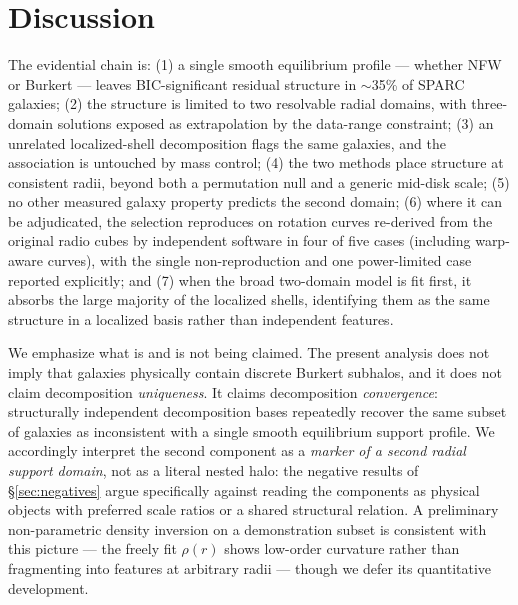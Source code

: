 \documentclass[twocolumn]{aastex701}
\begin{document}
\section{Discussion} \label{sec:discussion}

The evidential chain is: (1) a single smooth equilibrium profile ---
whether NFW or Burkert --- leaves BIC-significant residual structure in
$\sim$35\% of SPARC galaxies; (2) the structure is limited to two resolvable
radial domains, with three-domain solutions exposed as extrapolation by the
data-range constraint; (3) an unrelated localized-shell decomposition flags
the same galaxies, and the association is untouched by mass control; (4) the
two methods place structure at consistent radii, beyond both a permutation
null and a generic mid-disk scale; (5) no other measured galaxy property
predicts the second domain; (6) where it can be adjudicated, the selection
reproduces on rotation curves re-derived from the original radio cubes by
independent software in four of five cases (including warp-aware curves), with
the single non-reproduction and one power-limited case reported explicitly;
and (7) when the broad two-domain model is fit first, it absorbs the large
majority of the localized shells, identifying them as the same structure in a
localized basis rather than independent features.

We emphasize what is and is not being claimed. The present analysis does not
imply that galaxies physically contain discrete Burkert subhalos, and it does
not claim decomposition \emph{uniqueness}. It claims decomposition
\emph{convergence}: structurally independent decomposition bases repeatedly
recover the same subset of galaxies as inconsistent with a single smooth
equilibrium support profile. We accordingly interpret the second component as
a \emph{marker of a second radial support domain}, not as a literal nested
halo: the negative results of \S\ref{sec:negatives} argue specifically
against reading the components as physical objects with preferred scale
ratios or a shared structural relation. A preliminary non-parametric density
inversion on a demonstration subset is consistent with this picture --- the
freely fit $\rho(r)$ shows low-order curvature rather than fragmenting into
features at arbitrary radii --- though we defer its quantitative development.
\end{document}
